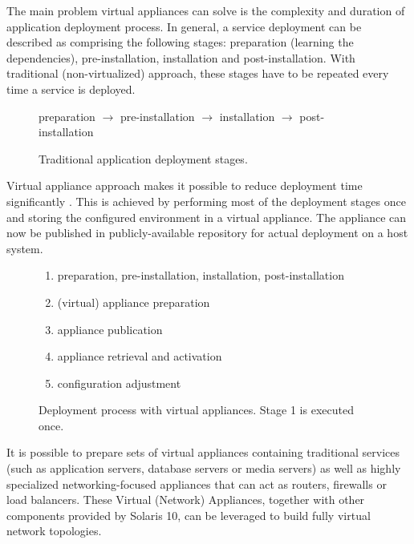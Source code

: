 \documentclass[11pt]{book}
\begin{document}
        The main problem virtual appliances can solve is the complexity and duration of application deployment process.
        In general, a service deployment can be described as comprising the following stages: preparation (learning the
        dependencies), pre-installation, installation and post-installation. With traditional (non-virtualized)
        approach, these stages have to be repeated every time a service is deployed.

        \begin{figure}[H]
          \begin{center}
            preparation $\rightarrow$ pre-installation $\rightarrow$ installation $\rightarrow$ post-installation
          \end{center}

          \caption{Traditional application deployment stages.}
        \end{figure}


        Virtual appliance approach makes it possible to reduce deployment time significantly \cite{changhua}. This is
        achieved by performing most of the deployment stages once and storing the configured environment in a virtual
        appliance. The appliance can now be published in publicly-available repository for actual deployment on a host
        system.

        \begin{figure}[H]

          \begin{enumerate}
            \item preparation, pre-installation, installation, post-installation
            \item (virtual) appliance preparation
            \item appliance publication
            \item appliance retrieval and activation
            \item configuration adjustment
          \end{enumerate}

          \caption{Deployment process with virtual appliances. Stage 1 is executed once.}
        \end{figure}

        It is possible to prepare sets of virtual appliances containing traditional services (such as application
        servers, database servers or media servers) as well as highly specialized networking-focused appliances that can
        act as routers, firewalls or load balancers. These Virtual (Network) Appliances, together with other components
        provided by Solaris 10,  can be leveraged to build fully virtual network topologies.
      
\end{document}
